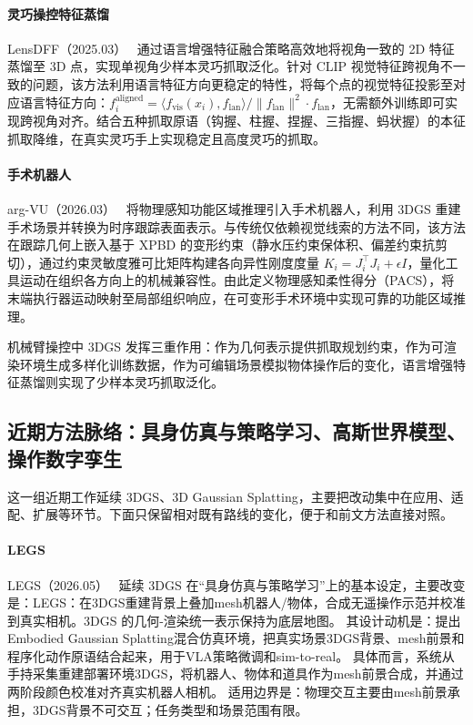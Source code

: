 \paragraph{灵巧操控特征蒸馏}

LensDFF（2025.03）~\cite{2503_03890} 通过语言增强特征融合策略高效地将视角一致的 2D 特征蒸馏至 3D 点，实现单视角少样本灵巧抓取泛化。针对 CLIP 视觉特征跨视角不一致的问题，该方法利用语言特征方向更稳定的特性，将每个点的视觉特征投影至对应语言特征方向：$f_i^{\text{aligned}} = \langle f_{\text{vis}}(x_i), f_{\text{lan}} \rangle / \|f_{\text{lan}}\|^2 \cdot f_{\text{lan}}$，无需额外训练即可实现跨视角对齐。结合五种抓取原语（钩握、柱握、捏握、三指握、蚂状握）的本征抓取降维，在真实灵巧手上实现稳定且高度灵巧的抓取。

\paragraph{手术机器人}

arg-VU（2026.03）~\cite{2603_26814} 将物理感知功能区域推理引入手术机器人，利用 3DGS 重建手术场景并转换为时序跟踪表面表示。与传统仅依赖视觉线索的方法不同，该方法在跟踪几何上嵌入基于 XPBD 的变形约束（静水压约束保体积、偏差约束抗剪切），通过约束灵敏度雅可比矩阵构建各向异性刚度度量 $K_i = J_i^\top J_i + \epsilon I$，量化工具运动在组织各方向上的机械兼容性。由此定义物理感知柔性得分（PACS），将末端执行器运动映射至局部组织响应，在可变形手术环境中实现可靠的功能区域推理。

\begin{takeaway}
机械臂操控中 3DGS 发挥三重作用：作为几何表示提供抓取规划约束，作为可渲染环境生成多样化训练数据，作为可编辑场景模拟物体操作后的变化，语言增强特征蒸馏则实现了少样本灵巧抓取泛化。
\end{takeaway}


\subsection{近期方法脉络：具身仿真与策略学习、高斯世界模型、操作数字孪生}

这一组近期工作延续 3DGS、3D Gaussian Splatting，主要把改动集中在应用、适配、扩展等环节。下面只保留相对既有路线的变化，便于和前文方法直接对照。

\paragraph{LEGS}
LEGS（2026.05）~\cite{2606_01458} 延续 3DGS 在“具身仿真与策略学习”上的基本设定，主要改变是：LEGS：在3DGS重建背景上叠加mesh机器人/物体，合成无遥操作示范并校准到真实相机。3DGS 的几何-渲染统一表示保持为底层地图。
其设计动机是：提出Embodied Gaussian Splatting混合仿真环境，把真实场景3DGS背景、mesh前景和程序化动作原语结合起来，用于VLA策略微调和sim-to-real。
具体而言，系统从手持采集重建部署环境3DGS，将机器人、物体和道具作为mesh前景合成，并通过两阶段颜色校准对齐真实机器人相机。
适用边界是：物理交互主要由mesh前景承担，3DGS背景不可交互；任务类型和场景范围有限。

